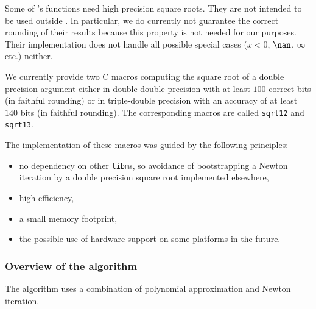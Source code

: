 Some of \crlibm's functions need high precision square roots.  They
are not intended to be used outside \crlibm. In particular, we do
currently not guarantee the correct rounding of their results because
this property is not needed for our purposes. Their implementation
does not handle all possible special cases ($x < 0$, $\nan$, $\infty$
etc.) neither.

We currently provide two C macros computing the square root of a
double precision argument either in double-double precision with at
least $100$ correct bits (in faithful rounding) or in triple-double
precision with an accuracy of at least $140$ bits (in faithful
rounding). The corresponding macros are called \texttt{sqrt12} and
\texttt{sqrt13}.

The implementation of these macros was guided by the following
principles:
\begin{itemize}
\item no dependency on other \texttt{libm}s, so avoidance of
bootstrapping a Newton iteration by a double precision square root
implemented elsewhere,
\item high efficiency,
\item a small memory footprint,
\item the possible use of hardware support on some platforms in the
future.
\end{itemize}
\subsubsection{Overview of the algorithm}
The algorithm uses a combination of polynomial approximation and
Newton iteration.

